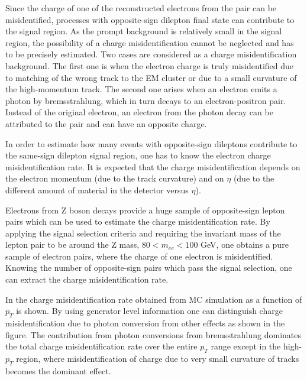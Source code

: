 
Since the charge of one of the reconstructed electrons from the pair can be misidentified, 
processes with opposite-sign dilepton final state can contribute to the signal region.
As the prompt background is relatively small in the signal region, the possibility of a charge misidentification cannot be neglected and has to be precisely estimated. 
Two cases are considered as a charge misidentification background. 
The first one is when the electron charge is truly misidentified due to matching of the wrong track to the EM cluster 
or due to a small curvature of the high-momentum track. 
The second one arises when an electron emits a photon by bremsstrahlung, which in turn decays to an electron-positron pair. 
Instead of the original electron, an electron from the photon decay can be attributed to the pair and can have an opposite charge.

In order to estimate how many events with opposite-sign dileptons contribute to the same-sign dilepton signal region, 
one has to know the electron charge misidentification rate. It is expected that the charge misidentification depends on the electron momentum (due to the track curvature) 
and on $\eta$ (due to the different amount of material in the detector versus $\eta$).

Electrons from Z boson decays provide a huge sample of opposite-sign lepton pairs which can be used to estimate the charge misidentification rate. 
By applying the signal selection criteria
and requiring the invariant mass of the lepton pair to be around the Z mass, $80 < m_{ee} < 100$ GeV, one obtains a pure
sample of electron pairs, where the charge of one electron is misidentified. Knowing the number of opposite-sign pairs which pass the signal selection, 
one can extract the charge misidentification rate.

In  the charge misidentification rate obtained from MC simulation as a function of $p_T$ is shown.
By using generator level information one can distinguish charge misidentification due to photon conversion from other effects as shown in the figure.
The contribution from photon conversions from bremsstrahlung dominates 
the total charge misidentification rate over the entire $p_T$ range except in the high-$p_T$ region, where misidentification 
of charge due to very small curvature of tracks becomes the dominant effect.

